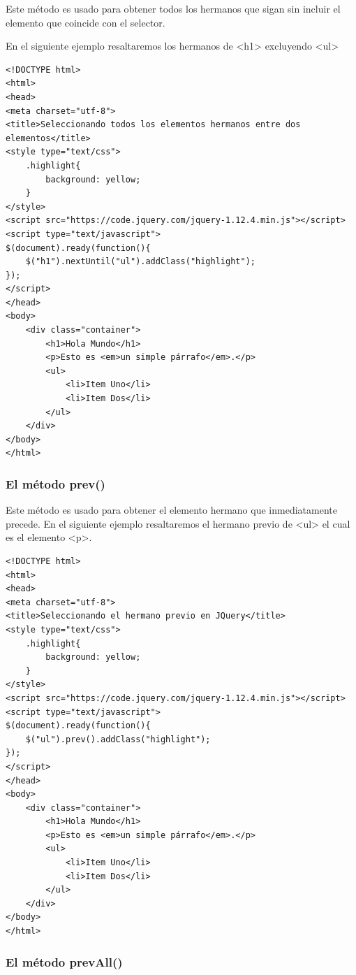 \documentclass[11pt]{article}
\begin{document}
Este método es usado para obtener todos los hermanos que sigan sin incluir el elemento que coincide con el selector. 

En el siguiente ejemplo resaltaremos los hermanos de <h1> excluyendo <ul>

\begin{verbatim}
<!DOCTYPE html>
<html>
<head>
<meta charset="utf-8">
<title>Seleccionando todos los elementos hermanos entre dos elementos</title>
<style type="text/css">
    .highlight{
        background: yellow;
    }        
</style>
<script src="https://code.jquery.com/jquery-1.12.4.min.js"></script>
<script type="text/javascript">
$(document).ready(function(){
    $("h1").nextUntil("ul").addClass("highlight");
});
</script>
</head>
<body>
    <div class="container">
        <h1>Hola Mundo</h1>
        <p>Esto es <em>un simple párrafo</em>.</p>
        <ul>
            <li>Item Uno</li>
            <li>Item Dos</li>
        </ul>
    </div>
</body>
</html>                                		
\end{verbatim}

\subsubsection*{El método prev()}
\label{sec:org0916135}

Este método es usado para obtener el elemento hermano que inmediatamente precede. En el siguiente ejemplo resaltaremos  el hermano previo de <ul> el cual es el elemento <p>.

\begin{verbatim}
<!DOCTYPE html>
<html>
<head>
<meta charset="utf-8">
<title>Seleccionando el hermano previo en JQuery</title>
<style type="text/css">
    .highlight{
        background: yellow;
    }        
</style>
<script src="https://code.jquery.com/jquery-1.12.4.min.js"></script>
<script type="text/javascript">
$(document).ready(function(){
    $("ul").prev().addClass("highlight");
});
</script>
</head>
<body>
    <div class="container">
        <h1>Hola Mundo</h1>
        <p>Esto es <em>un simple párrafo</em>.</p>
        <ul>
            <li>Item Uno</li>
            <li>Item Dos</li>
        </ul>
    </div>
</body>
</html>                                		
\end{verbatim}

\subsubsection*{El método prevAll()}
\label{sec:org2d69753}
\end{document}
